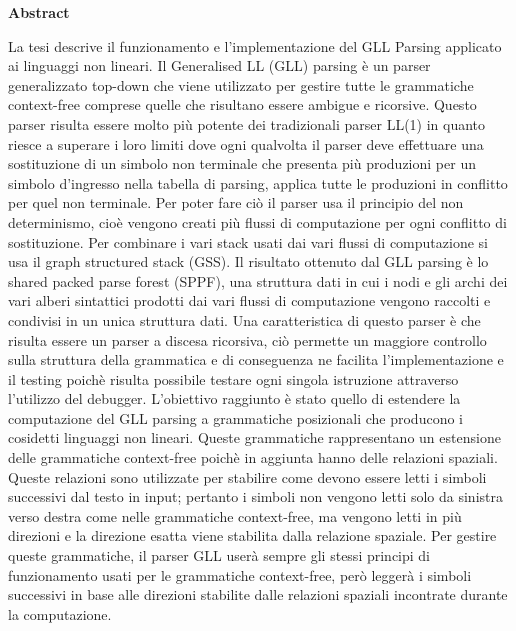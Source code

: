 \documentclass[12pt]{article}
\begin{document}
	\begin{center}
		{\huge\bf Abstract}\par
	\end{center}
	La tesi descrive il funzionamento e l'implementazione del GLL Parsing applicato ai linguaggi non lineari. Il Generalised LL (GLL) parsing è un parser generalizzato top-down che viene utilizzato per gestire tutte le grammatiche context-free comprese quelle che risultano essere ambigue e ricorsive. Questo parser risulta essere molto più potente dei tradizionali parser LL(1) in quanto riesce a superare i loro limiti dove ogni qualvolta il parser deve effettuare una sostituzione di un simbolo non terminale che presenta più produzioni per un simbolo d'ingresso nella tabella di parsing, applica tutte le produzioni in conflitto per quel non terminale. Per poter fare ciò il parser usa il principio del non determinismo, cioè vengono creati più flussi di computazione per ogni conflitto di sostituzione. Per combinare i vari stack usati dai vari flussi di computazione si usa il graph structured stack (GSS). Il risultato ottenuto dal GLL parsing è lo shared packed parse forest (SPPF), una struttura dati in cui i nodi e gli archi dei vari alberi sintattici prodotti dai vari flussi di computazione vengono raccolti e condivisi in un unica struttura dati. Una caratteristica di questo parser è che risulta essere un parser a discesa ricorsiva, ciò permette un maggiore controllo sulla struttura della grammatica e di conseguenza ne facilita l'implementazione e il testing poichè risulta possibile testare ogni singola istruzione attraverso l'utilizzo del debugger. L'obiettivo raggiunto è stato quello di estendere la computazione del GLL parsing a grammatiche posizionali che producono i cosidetti linguaggi non lineari. Queste grammatiche rappresentano un estensione delle grammatiche context-free poichè in aggiunta hanno delle relazioni spaziali. Queste relazioni sono utilizzate per stabilire come devono essere letti i simboli successivi dal testo in input; pertanto i simboli non vengono letti solo da sinistra verso destra come nelle grammatiche context-free, ma vengono letti in più direzioni e la direzione esatta viene stabilita dalla relazione spaziale. Per gestire queste grammatiche, il parser GLL userà sempre gli stessi principi di funzionamento usati per le grammatiche context-free, però leggerà i simboli successivi in base alle direzioni stabilite dalle relazioni spaziali incontrate durante la computazione.
\end{document}
